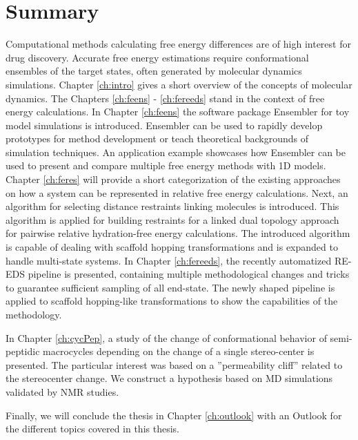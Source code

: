 \chapter{Summary}
Computational methods calculating free energy differences are of high interest for drug discovery. Accurate free energy estimations require conformational ensembles of the target states, often generated by molecular dynamics simulations. Chapter \ref{ch:intro} gives a short overview of the concepts of molecular dynamics.   
The Chapters \ref{ch:feens} - \ref{ch:fereeds} stand in the context of free energy calculations. 
In Chapter \ref{ch:feens} the software package Ensembler for toy model simulations is introduced. Ensembler can be used to rapidly develop prototypes for method development or teach theoretical backgrounds of simulation techniques.  An application example showcases how Ensembler can be used to present and compare multiple free energy methods with 1D models. 
Chapter \ref{ch:feres} will provide a short categorization of the existing approaches on how a system can be represented in relative free energy calculations. Next, an algorithm for selecting distance restraints linking molecules is introduced. This algorithm is applied for building restraints for a linked dual topology approach for pairwise relative hydration-free energy calculations. The introduced algorithm is capable of dealing with scaffold hopping transformations and is expanded to handle multi-state systems.
In Chapter \ref{ch:fereeds}, the recently automatized RE-EDS pipeline is presented, containing multiple methodological changes and tricks to guarantee sufficient sampling of all end-state. The newly shaped pipeline is applied to scaffold hopping-like transformations to show the capabilities of the methodology.

In Chapter \ref{ch:cycPep}, a study of the change of conformational behavior of semi-peptidic macrocycles depending on the change of a single stereo-center is presented. The particular interest was based on a ''permeability cliff'' related to the stereocenter change. We construct a hypothesis based on MD simulations validated by NMR studies.

Finally, we will conclude the thesis in Chapter \ref{ch:outlook} with an Outlook for the different topics covered in this thesis.
